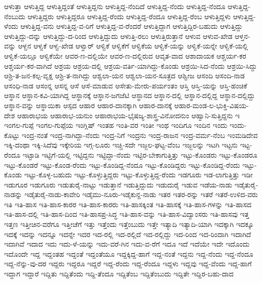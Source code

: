{ಆಳುತ್ತಾ
ಆಳುತ್ತಿದ್ದ
ಆಳುತ್ತಿದ್ದಂತೆ
ಆಳುತ್ತಿದ್ದನು
ಆಳುತ್ತಿದ್ದ-ನೆಂದಿದೆ
ಆಳುತ್ತಿದ್ದ-ನೆಂದು
ಆಳುತ್ತಿದ್ದ-ನೆಂದೂ
ಆಳುತ್ತಿದ್ದ-ನೆಂಬುದು
ಆಳುತ್ತಿದ್ದರು
ಆಳುತ್ತಿದ್ದರೂ
ಆಳುತ್ತಿದ್ದ-ರೆಂದು
ಆಳುತ್ತಿದ್ದ-ರೆಂದೂ
ಆಳುತ್ತಿದ್ದ-ರೆಂಬ
ಆಳುತ್ತಿದ್ದಳು
ಆಳುತ್ತಿದ್ದ-ಳೆಂದು
ಆಳುತ್ತಿದ್ದ-ವನು
ಆಳುತ್ತಿದ್ದ-ವ-ರಿಗೆ
ಆಳುತ್ತಿದ್ದ-ವ-ರೆಂದರೆ
ಆಳುತ್ತಿದ್ದಾಗ
ಆಳುತ್ತಿದ್ದಿರ-ಬಹುದು
ಆಳುತ್ತಿದ್ದು
ಆಳುತ್ತಿದ್ದು-ದನ್ನು
ಆಳುತ್ತಿದ್ದು-ದ-ರಿಂದ
ಆಳುತ್ತಿದ್ದುದು
ಆಳುತ್ತಿ-ರಲು
ಆಳುತ್ತಿರುತ್ತಾನೆ
ಆಳುವ
ಆಳುವ-ಖೇಡ
ಆಳ್ತನ-ವನ್ನು
ಆಳ್ದನ
ಆಳ್ವಕೆ
ಆಳ್ವ-ಖೇಡ
ಆಳ್ವಾರ್
ಆಳ್ವಿಕೆ
ಆಳ್ವಿಕೆಗೆ
ಆಳ್ವಿಕೆಯ
ಆಳ್ವಿಕೆ-ಯನ್ನು
ಆಳ್ವಿಕೆ-ಯನ್ನೇ
ಆಳ್ವಿಕೆ-ಯಲ್ಲಿ
ಆಳ್ವಿಕೆ-ಯಲ್ಲೂ
ಆಳ್ವಿಕೆಯೇ
ಆವರ-ಣ-ದಲ್ಲಿಯೇ
ಆವರ-ಣ-ದಲ್ಲಿರುವ
ಆವೃತ-ವಾದ
ಆಶಾದಾಯಕ
ಆಶ್ಚರ್ಯ-ಕರ
ಆಶ್ಚರ್ಯ-ಕರ-ವಾಗಿದೆ
ಆಶ್ರಯ
ಆಶ್ರಯ-ದಲ್ಲಿ
ಆಶ್ರಯ-ವರ್ತಿ-ಯಾಗಿದ್ದು-ಕೊಂಡು
ಆಶ್ರಯಿ-ಸಿದ-ನೆಂದು
ಆಶ್ರಯಿ-ಸಿದ್ದು
ಆಶ್ರಿ-ತ-ಜನ-ಕಲ್ಪ-ವೃಕ್ಷ
ಆಶ್ರಿ-ತ-ನಾಗಿದ್ದು
ಆಶ್ವಲಾ-ಯನ
ಆಶ್ವಲಾ-ಯನ-ಸೂತ್ರದ
ಆಶ್ವೀಜ
ಆಸಂದಿ
ಆಸಂದಿ-ನಾಡ
ಆಸಂಧಿ-ನಾಡ
ಆಸಂನ್ನ
ಆಸನ್ನ
ಆಸೆ
ಆಸೆ-ಮಾಡುವ
ಆಸೇತು-ಮೇರು-ಪರ್ಯಂತಂ
ಆಸ್ತಿ
ಆಸ್ತಿ-ಯನ್ನು
ಆಸ್ತಿ-ಹಂಚಿಕೆ
ಆಸ್ಥಾನ
ಆಸ್ಥಾನ-ಕವಿ-ಯಾಗಿದ್ದ
ಆಸ್ಥಾನಕ್ಕೆ
ಆಸ್ಥಾನ-ಜಗಜೆಟಿ
ಆಸ್ಥಾನದ
ಆಸ್ಥಾನ-ದಲ್ಲಿ
ಆಸ್ಥಾನ-ದಲ್ಲಿದ್ದ
ಆಸ್ಥಾನ-ದಲ್ಲಿದ್ದು
ಆಸ್ಥಾನ-ವನ್ನು
ಆಸ್ಥಾಯಿಕಾ
ಆಸ್ಪದ
ಆಹಾರ
ಆಹಾರ-ದಾನಕ್ಕಾಗಿ
ಆಹಾರ-ದಾನಕ್ಕೆ
ಆಹಾರ-ಮಂಡ-ಲ-ಭುಕ್ತಿ-ವಿಷಯ-ದೇಶ
ಆಹಾರಾಭಯ
ಆಹಾರಾಭ-ಯನುಂ
ಆಹಾರಾಭಯ-ಭೈಷಜ್ಯ-ಶಾಸ್ತ್ರ-ವಿನೋದನುಂ
ಆಹ್ವಾನಿ-ಸುತ್ತಿದ್ದನು
ಇ
ಇಂಗಲ-ಗುಪ್ಪೆ
ಇಂಗಲ-ಗುಪ್ಪೆಯ
ಇಂಗ್ಲಿಷ್
ಇಂತಹ
ಇಂತಿ-ವರ
ಇಂತೀ
ಇಂಥ
ಇಂದಿಗೂ
ಇಂದಿನ
ಇಂದು
ಇಂದು-ಕೊಟ್ಟು
ಇಂದ್ರ-ನಂತೆ
ಇಂದ್ರ-ನಾಗಿದ್ದಾ-ನೆಂದು
ಇಂದ್ರ-ನಿಗೆ
ಇಂದ್ರನು
ಇಂದ್ರ-ರಾಜನ
ಇಂದ್ರ-ವರ್ಮ-ನೆಂಬ
ಇಂಮಡಿದೇವ
ಇಕ್ಕಿ-ದಂಥಾ
ಇಕ್ಕಿ-ಸಿದೆವು
ಇಕ್ಕೇರಿಯ
ಇಗ್ಗ-ಲೂರು
ಇಚ್ಚಿ-ಸದೇ
ಇಜ್ಜಲ-ಘಟ್ಟ-ವೆಂಬ
ಇಜ್ಜಲನ್ನು
ಇಟಗಿ
ಇಟ್ಟನು
ಇಟ್ಟ-ರೆಂದೂ
ಇಟ್ಟಾಡಿ
ಇಟ್ಟಿಗೆ-ಯಲ್ಲಿ
ಇಟ್ಟಿದ್ದನು
ಇಟ್ಟಿದ್ದಾ-ನೆಂದು
ಇಟ್ಟಿರ-ಬೇಕಾಗುತ್ತಿತ್ತು
ಇಟ್ಟು-ಕೊಂಡರು
ಇಟ್ಟು-ಕೊಂಡರೂ
ಇಟ್ಟು-ಕೊಂಡರೆ
ಇಟ್ಟು-ಕೊಂಡ-ರೆಂದು
ಇಟ್ಟು-ಕೊಂಡಿದ್ದ-ನೆಂದೂ
ಇಟ್ಟು-ಕೊಂಡಿದ್ದರು
ಇಟ್ಟು-ಕೊಂಡಿದ್ದ-ರೆಂದು
ಇಟ್ಟು-ಕೊಂಡು
ಇಟ್ಟು-ಕೊಳ್ಳ-ಬಹುದು
ಇಟ್ಟು-ಕೊಳ್ಳುತ್ತಿದ್ದರು
ಇಟ್ಟು-ಕೊಳ್ಳುತ್ತಿದ್ದ-ರೆಂದು
ಇಡಗೂರು
ಇಡ-ಲಾಗುತ್ತಿತ್ತು
ಇಡೀ
ಇಡುಗೂರ
ಇಡುಗೂರು
ಇಡುತುರೈ-ನಾಟ್ಟು
ಇಡುತ್ತಾನೆ
ಇಡುತ್ತಿದ್ದುದು
ಇಡುದುರೈ
ಇಡುವ
ಇಡೆಯ-ನಾಡು
ಇಡೈತುರೈ-ನಾಡನ್ನು
ಇಡೈತುರೈ-ನಾಡು-ಕಾವೇರಿ
ಇಡೈಮು-ನೂರು-ಇಡೈಕುನ್ದ-ನಾಡು
ಇತರ
ಇತರ-ರನ್ನು
ಇತರೆ
ಇತರೆ-ಉಳಿದ-ವರು
ಇತಿ
ಇತಿ-ಹಾಸ
ಇತಿ-ಹಾಸ-ಕಾರರ
ಇತಿ-ಹಾಸ-ಕಾರರು
ಇತಿ-ಹಾಸಕ್ಕಿಂತ
ಇತಿ-ಹಾಸಕ್ಕೆ
ಇತಿ-ಹಾಸ-ಗಳನ್ನು
ಇತಿ-ಹಾಸದ
ಇತಿ-ಹಾಸ-ದಲ್ಲಿ
ಇತಿ-ಹಾಸ-ದಿಂದ
ಇತಿ-ಹಾಸಪ್ರ-ಸಿದ್ಧ
ಇತಿ-ಹಾಸ-ವನ್ನು
ಇತಿ-ಹಾಸ-ವಿದ್ವಾಂಸರು
ಇತಿ-ಹಾಸವು
ಇತ್ತ
ಇತ್ತಣ
ಇತ್ತೀಚಿನ-ವರೆಗೂ
ಇತ್ತೀಚೆಗೆ
ಇತ್ತು
ಇತ್ತೆಂದು
ಇತ್ತೆಂಬುದು
ಇತ್ತೇ
ಇತ್ಯಾದಿ
ಇತ್ಯಾದಿ-ಯಾಗಿ
ಇದಕ್ಕಾಗಿ
ಇದಕ್ಕೂ
ಇದಕ್ಕೆ
ಇದನ್ನು
ಇದನ್ನೂ
ಇದನ್ನೇ
ಇದರ
ಇದ-ರಲ್ಲಿ
ಇದ-ರಲ್ಲಿದೆ
ಇದ-ರಲ್ಲಿದ್ದು
ಇದ-ರಿಂದ
ಇದ-ರಿಂದಾಗಿ
ಇದಾಗಿದೆ
ಇದಾಗಿವೆ
ಇದಾದ
ಇದು
ಇದು-ಳೆ-ಯನ್ನು
ಇದು-ವರೆ-ಗಿನ
ಇದು-ವ-ರೆಗೆ
ಇದೂ
ಇದೆ
ಇದೆಯೇ
ಇದೇ
ಇದೊಂದು
ಇದೊಂದೇ
ಇದ್ದ
ಇದ್ದಂತಹ
ಇದ್ದಂತೆ
ಇದ್ದಂತೆಯೂ
ಇದ್ದಕ್ಕಿದ್ದ-ಹಾಗೆ
ಇದ್ದ-ನಂತೆ
ಇದ್ದನು
ಇದ್ದ-ನೆಂದು
ಇದ್ದ-ನೆಂದೂ
ಇದ್ದ-ನೆನ್ನು-ವು-ದರ
ಇದ್ದರು
ಇದ್ದರೂ
ಇದ್ದರೆ
ಇದ್ದ-ರೆಂದು
ಇದ್ದ-ರೆಂದೂ
ಇದ್ದಳು
ಇದ್ದವು
ಇದ್ದ-ವೆಂದು
ಇದ್ದ-ಹಾಗೆ
ಇದ್ದಾಗ
ಇದ್ದಾರೆ
ಇದ್ದಿತು
ಇದ್ದಿತೆಂದು
ಇದ್ದಿ-ತೆಂದೂ
ಇದ್ದಿತೆಂಬ
ಇದ್ದಿತೆಂಬುದು
ಇದ್ದಿತೇ
ಇದ್ದಿರ-ಬಹು-ದಾದ
}
